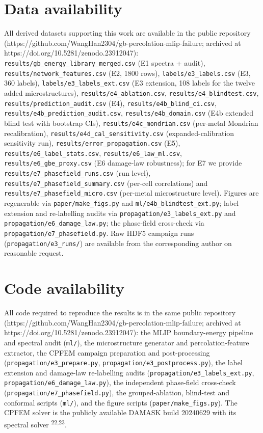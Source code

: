 \documentclass[11pt]{article}
\begin{document}
\section{Data availability}

{\sloppy
All derived datasets supporting this work are available in the public repository (\mbox{https://github.com/WangHan2304/gb-percolation-mlip-failure}; archived at \mbox{https://doi.org/10.5281/zenodo.23912047}): \texttt{results/gb\_energy\_library\_merged.csv} (E1 spectra + audit), \texttt{results/network\_features.csv} (E2, 1800 rows), \texttt{labels/e3\_labels.csv} (E3, 360 labels), \texttt{labels/e3\_labels\_ext.csv} (E3 extension, 108 labels for the twelve added microstructures), \texttt{results/e4\_ablation.csv}, \texttt{results/e4\_blindtest.csv}, \texttt{results/prediction\_audit.csv} (E4), \texttt{results/e4b\_blind\_ci.csv}, \texttt{results/e4b\_prediction\_audit.csv}, \texttt{results/e4b\_domain.csv} (E4b extended blind test with bootstrap CIs), \texttt{results/e4c\_mondrian.csv} (per-metal Mondrian recalibration), \texttt{results/e4d\_cal\_sensitivity.csv} (expanded-calibration sensitivity run), \texttt{results/error\_propagation.csv} (E5), \texttt{results/e6\_label\_stats.csv}, \texttt{results/e6\_law\_ml.csv}, \texttt{results/e6\_gbe\_proxy.csv} (E6 damage-law robustness); for E7 we provide \texttt{results/e7\_phasefield\_runs.csv} (run level), \texttt{results/e7\_phasefield\_summary.csv} (per-cell correlations) and \texttt{results/e7\_phasefield\_micro.csv} (per-metal microstructure level). Figures are regenerable via \texttt{paper/make\_figs.py} and \texttt{ml/e4b\_blindtest\_ext.py}; label extension and re-labelling audits via \texttt{propagation/e3\_labels\_ext.py} and \texttt{propagation/e6\_damage\_law.py}; the phase-field cross-check via \texttt{propagation/e7\_phasefield.py}. Raw HDF5 campaign runs (\texttt{propagation/e3\_runs/}) are available from the corresponding author on reasonable request.\par}

\section{Code availability}

{\sloppy
All code required to reproduce the results is in the same public repository (\mbox{https://github.com/WangHan2304/gb-percolation-mlip-failure}; archived at \mbox{https://doi.org/10.5281/zenodo.23912047}): the MLIP boundary-energy pipeline and spectral audit (\texttt{ml/}), the microstructure generator and percolation-feature extractor, the CPFEM campaign preparation and post-processing (\texttt{propagation/e3\_prepare.py}, \texttt{propagation/e3\_postprocess.py}), the label extension and damage-law re-labelling audits (\texttt{propagation/e3\_labels\_ext.py}, \texttt{propagation/e6\_damage\_law.py}), the independent phase-field cross-check (\texttt{propagation/e7\_phasefield.py}), the grouped-ablation, blind-test and conformal scripts (\texttt{ml/}), and the figure scripts (\texttt{paper/make\_figs.py}). The CPFEM solver is the publicly available DAMASK build 20240629 with its spectral solver \textsuperscript{22,23}.\par}
\end{document}
